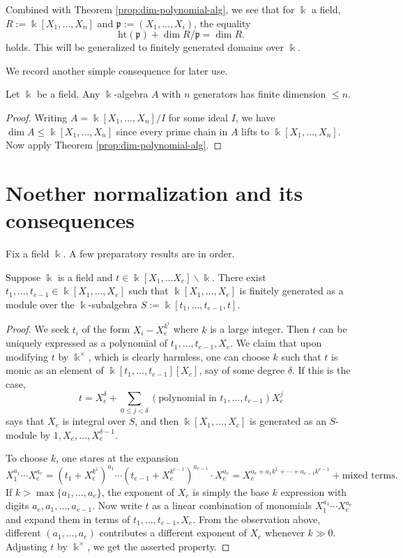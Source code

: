 Combined with Theorem \ref{prop:dim-polynomial-alg}, we see that for $\Bbbk$ a field, $R := \Bbbk[X_1, \ldots, X_n]$ and $\mathfrak{p} := (X_1, \ldots, X_i)$, the equality
\[ \text{ht}(\mathfrak{p}) + \dim R/\mathfrak{p} = \dim R. \]
holds. This will be generalized to finitely generated domains over $\Bbbk$.

We record another simple consequence for later use.
\begin{corollary}\label{prop:fg-dimension-bound}
	Let $\Bbbk$ be a field. Any $\Bbbk$-algebra $A$ with $n$ generators has finite dimension $\leq n$.
\end{corollary}
\begin{proof}
	Writing $A = \Bbbk[X_1, \ldots, X_n]/I$ for some ideal $I$, we have $\dim A \leq \Bbbk[X_1, \ldots, X_n]$ since every prime chain in $A$ lifts to $\Bbbk[X_1, \ldots, X_n]$. Now apply Theorem \ref{prop:dim-polynomial-alg}.
\end{proof}

\section{Noether normalization and its consequences}
Fix a field $\Bbbk$. A few preparatory results are in order.

\begin{lemma}\label{prop:normalization-Nagata}
	Suppose $\Bbbk$ is a field and $t \in \Bbbk[X_1, \ldots X_e] \smallsetminus \Bbbk$. There exist $t_1, \ldots, t_{e-1} \in \Bbbk[X_1, \ldots, X_e]$ such that $\Bbbk[X_1, \ldots, X_e]$ is finitely generated as a module over the $\Bbbk$-subalgebra $S := \Bbbk[t_1, \ldots, t_{e-1}, t]$.
\end{lemma}
\begin{proof}
	We seek $t_i$ of the form $X_i - X_e^{k^i}$ where $k$ is a large integer. Then $t$ can be uniquely expressed as a polynomial of $t_1, \ldots, t_{e-1}, X_e$. We claim that upon modifying $t$ by $\Bbbk^\times$, which is clearly harmless, one can choose $k$ such that $t$ is monic as an element of $\Bbbk[t_1, \ldots, t_{e-1}][X_e]$, say of some degree $\delta$. If this is the case,
	\[ t = X_e^\delta + \sum_{0 \leq j < \delta} \left(\text{polynomial in } t_1, \ldots, t_{e-1}\right) X_e^j \]
	says that $X_e$ is integral over $S$, and then $\Bbbk[X_1, \ldots, X_e]$ is generated as an $S$-module by $1, X_e, \ldots, X_e^{\delta-1}$.
	
	To choose $k$, one stares at the expansion
	\[ X_1^{a_1} \cdots X_e^{a_e} = \left(t_1 + X_e^{k^1}\right)^{a_1} \cdots \left(t_{e-1} + X_e^{k^{e-1}}\right)^{a_{e-1}} \cdot X_e^{a_e} = X_e^{a_e + a_1 k^1 + \cdots + a_{e-1} k^{e-1}} + \text{mixed terms}. \]
	If $k > \max\{a_1, \ldots, a_e \}$, the exponent of $X_e$ is simply the base $k$ expression with digits $a_e, a_1, \ldots, a_{e-1}$. Now write $t$ as a linear combination of monomials $X_1^{a_1} \cdots X_e^{a_e}$ and expand them in terms of $t_1, \ldots, t_{e-1}, X_e$. From the observation above, different $(a_1, \ldots, a_e)$ contributes a different exponent of $X_e$ whenever $k \gg 0$. Adjusting $t$ by $\Bbbk^\times$, we get the asserted property.
\end{proof}

